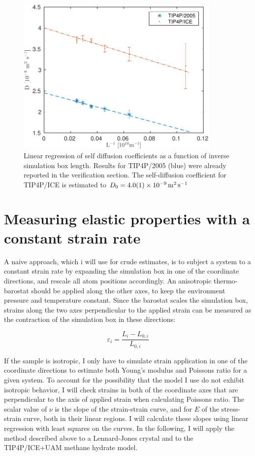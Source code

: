 \begin{figure}
\centering
\includegraphics[width=10cm]{../figures/thesis/diffusivity_comparison_tip4p_ice_2005.pdf}
\caption{Linear regression of self diffusion coefficients as a function of inverse simulation box length. Results for TIP4P/2005 (blue) were already reported in the verification section. The self-diffusion coefficient for TIP4P/ICE is estimated to $D_0 = \SI{4.0 \pm 0.1 d-9}{\meter\squared\per\second}$}
\label{fig:diffusivity_comparison_tip4p_ice_2005}
\end{figure}

\section{Measuring elastic properties with a constant strain rate}
A naive approach, which i will use for crude estimates, is to subject a system to a constant strain rate by expanding the simulation box in one of the coordinate directions, and rescale all atom positions accordingly. An anisotropic thermo-barostat should be applied along the other axes, to keep the environment pressure and temperature constant. Since the barostat scales the simulation box, strains along the two axes perpendicular to the applied strain can be measured as the contraction of the simulation box in these directions:

\begin{equation}
\varepsilon_i = \frac{L_i-L_{0, i}}{L_{0, i}}
\end{equation}

If the sample is isotropic, I only have to simulate strain application in one of the coordinate directions to estimate both Young's modulus and Poissons ratio for a given system. To account for the possibility that the model I use do not exhibit isotropic behavior, I will check strains in both of the coordinate axes that are perpendicular to the axis of applied strain when calculating Poissons ratio. The scalar value of $\nu$ is the slope of the strain-strain curve, and for $E$ of the stress-strain curve, both in their linear regions. I will calculate these slopes using linear regression with least squares on the curves.
In the following, I will apply the method described above to a Lennard-Jones crystal and to the TIP4P/ICE+UAM methane hydrate model.

